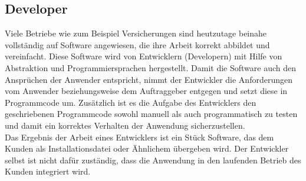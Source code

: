 \subsection{Developer}
Viele Betriebe wie zum Beispiel Versicherungen sind heutzutage beinahe vollständig auf Software angewiesen, die ihre Arbeit korrekt abbildet und vereinfacht. Diese Software wird von Entwicklern (Developern) mit Hilfe von Abstraktion und Programmiersprachen hergestellt. Damit die Software auch den Ansprüchen der Anwender entspricht, nimmt der Entwickler die Anforderungen vom Anwender beziehungsweise dem Auftraggeber entgegen und setzt diese in Programmcode um. Zusätzlich ist es die Aufgabe des Entwicklers den geschriebenen Programmcode sowohl manuell als auch programmatisch zu testen und damit ein korrektes Verhalten der Anwendung sicherzustellen.\\
Das Ergebnis der Arbeit eines Entwicklers ist ein Stück Software, das dem Kunden als Installationsdatei oder Ähnlichem übergeben wird. Der Entwickler selbst ist nicht dafür zuständig, dass die Anwendung in den laufenden Betrieb des Kunden integriert wird.

